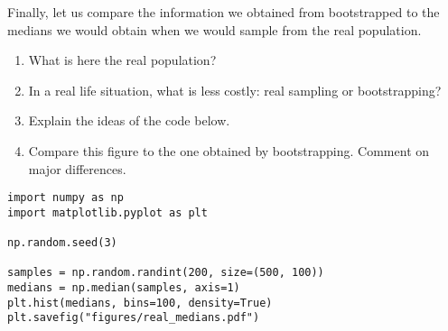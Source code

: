\begin{exercise}
Finally, let us compare the information we obtained from bootstrapped to the medians we would obtain when we would sample from the real population.
\begin{enumerate}
\item What is here the real population?
\item In a real life situation, what is less costly: real sampling or bootstrapping?
\item Explain the ideas of the code below.
\item Compare this figure to the one obtained by bootstrapping. Comment on major differences.
\end{enumerate}
\begin{verbatim}
import numpy as np
import matplotlib.pyplot as plt

np.random.seed(3)

samples = np.random.randint(200, size=(500, 100))
medians = np.median(samples, axis=1)
plt.hist(medians, bins=100, density=True)
plt.savefig("figures/real_medians.pdf")
\end{verbatim}
\end{exercise}





